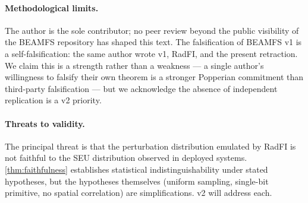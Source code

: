 \paragraph{Methodological limits.}
The author is the sole contributor; no peer review beyond the
public visibility of the BEAMFS repository has shaped this text.
The falsification of BEAMFS v1 is a self-falsification: the same
author wrote v1, RadFI, and the present retraction. We claim this
is a strength rather than a weakness --- a single author's
willingness to falsify their own theorem is a stronger Popperian
commitment than third-party falsification --- but we acknowledge
the absence of independent replication is a v2 priority.

\paragraph{Threats to validity.}
The principal threat is that the perturbation distribution emulated
by RadFI is not faithful to the SEU distribution observed in
deployed systems. \cref{thm:faithfulness} establishes statistical
indistinguishability under stated hypotheses, but the hypotheses
themselves (uniform sampling, single-bit primitive, no spatial
correlation) are simplifications. v2 will address each.
